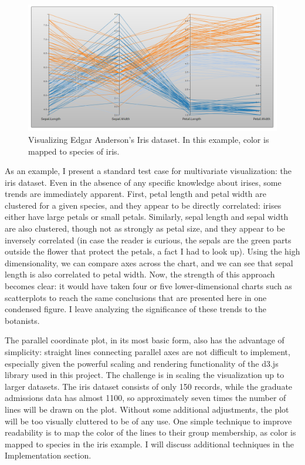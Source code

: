 \documentclass[]{article}
\begin{document}
	\begin{figure}[h]
		\includegraphics[width=\linewidth]{iris.png}
		\caption{Visualizing Edgar Anderson's Iris dataset. In this example, color is mapped to species of iris.}
		\label{fig:Result}
	\end{figure}
	
	\par As an example, I present a standard test case for multivariate visualization: the iris dataset.\cite{datasets} Even in the absence of any specific knowledge about irises, some trends are immediately apparent. First, petal length and petal width are clustered for a given species, and they appear to be directly correlated: irises either have large petals or small petals. Similarly, sepal length and sepal width are also clustered, though not as strongly as petal size, and they appear to be inversely correlated (in case the reader is curious, the sepals are the green parts outside the flower that protect the petals, a fact I had to look up). Using the high dimensionality, we can compare axes across the chart, and we can see that sepal length is also correlated to petal width. Now, the strength of this approach becomes clear: it would have taken four or five lower-dimensional charts such as scatterplots to reach the same conclusions that are presented here in one condensed figure. I leave analyzing the significance of these trends to the botanists.
	
	\par The parallel coordinate plot, in its most basic form, also has the advantage of simplicity: straight lines connecting parallel axes are not difficult to implement, especially given the powerful scaling and rendering functionality of the d3.js library\cite{d3} used in this project. The challenge is in scaling the visualization up to larger datasets. The iris dataset consists of only 150 records, while the graduate admissions data has almost 1100, so approximately seven times the number of lines will be drawn on the plot. Without some additional adjustments, the plot will be too visually cluttered to be of any use. One simple technique to improve readability is to map the color of the lines to their group membership, as color is mapped to species in the iris example. I will discuss additional techniques in the Implementation section.
	
\end{document}
